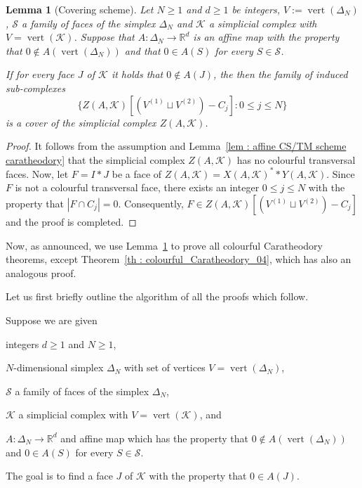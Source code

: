 \documentclass[a4paper,11pt,reqno, english]{amsart}
\newtheorem{lemma}[theorem]{Lemma}
\theoremstyle{definition}
\theoremstyle{remark}
\newcommand\R{\mathbb R}
\DeclareMathOperator{\vertex}{\mathrm{vert}}
\begin{document}
\medskip
\begin{lemma}[Covering scheme]\label{lem : affine CS/TM scheme 02 caratheodory}
	Let $N\geq 1$ and $d\geq 1$ be integers, $V:=\vertex(\Delta_N)$, $\mathcal{S}$ a family of faces of the simplex $\Delta_N$ and $\mathcal{K}$ a simplicial complex with $V=\vertex(\mathcal{K})$.
	Suppose that $A\colon\Delta_N\longrightarrow\R^d$ is an affine map with the property that $0\notin A(\vertex(\Delta_N))$ and that $0\in A(S)$ for every $S\in \mathcal{S}$.

	\smallskip\noindent
	If for every face $J$ of $\mathcal{K}$ it holds that $0\notin A(J)$, the then the family of induced sub-complexes
	\[
		\{ Z(A,\mathcal{K})[(V^{(1)}\sqcup  V^{(2)}) - C_{j} ]:  0\leq j\leq N \}
	\]
	is a cover of the simplicial complex $Z(A,\mathcal{K})$.
\end{lemma}
\begin{proof}
	It follows from the assumption and Lemma~\ref{lem : affine CS/TM scheme caratheodory} that the simplicial complex $Z(A,\mathcal{K})$ has no colourful transversal faces.
	Now, let $F=I*J$ be a face of $Z(A,\mathcal{K})=X(A,\mathcal{K})^**Y(A,\mathcal{K})$.
	Since $F$ is not a colourful transversal face, there exists an integer $0\leq j\leq N$  with the property that $|F\cap C_{j}|=0$.
	Consequently, $F\in  Z(A,\mathcal{K})[(V^{(1)}\sqcup  V^{(2)}) - C_{j} ]$ and the proof is completed.
\end{proof}

\medskip
Now, as announced, we use Lemma~\ref{lem : affine CS/TM scheme 02 caratheodory} to prove all colourful Caratheodory theorems, except Theorem~\ref{th : colourful_Caratheodory_04}, which has also an analogous proof.

\medskip
Let us first briefly outline the algorithm of all the proofs which follow.

\medskip
Suppose we are given
\begin{compactitem}[\rm \quad --]
	\item integers $d\geq 1$ and $N\geq 1$,
	\item $N$-dimensional simplex $\Delta_N$ with set of vertices $V=\vertex(\Delta_N)$,
	\item $\mathcal{S}$ a family of faces of the simplex $\Delta_N$,
	\item $\mathcal{K}$ a simplicial complex with $V=\vertex(\mathcal{K})$, and
	\item $A\colon\Delta_N\longrightarrow\R^d$ and affine map which has the property that $0\notin A(\vertex(\Delta_N))$ and $0\in A(S)$ for every $S\in \mathcal{S}$.
\end{compactitem}
The goal is to find a face $J$ of $\mathcal{K}$ with the property that $0\in A(J)$.
\end{document}
